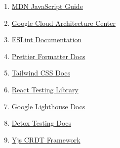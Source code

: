 \documentclass[12pt,a4paper]{report}
\begin{document}
\begin{enumerate}[label=\arabic*., leftmargin=*]
  \item \href{https://developer.mozilla.org/en-US/docs/Web/JavaScript/Guide}{MDN JavaScript Guide}\label{res:mdn}
  \item \href{https://cloud.google.com/architecture}{Google Cloud Architecture Center}\label{res:gcp}
  \item \href{https://eslint.org/docs/latest}{ESLint Documentation}\label{res:eslint}
  \item \href{https://prettier.io/docs/en/index.html}{Prettier Formatter Docs}\label{res:prettier}
  \item \href{https://tailwindcss.com/docs}{Tailwind CSS Docs}\label{res:tailwind}
  \item \href{https://testing-library.com/docs/react-testing-library/intro}{React Testing Library}\label{res:reacttestinglibrary}
  \item \href{https://developer.chrome.com/docs/lighthouse/}{Google Lighthouse Docs}\label{res:lighthouse}
  \item \href{https://wix.github.io/Detox/docs/api}{Detox Testing Docs}\label{res:detox}
  \item \href{https://yjs.dev/}{Yjs CRDT Framework}\label{res:crdt}
\end{enumerate}
\end{document}
